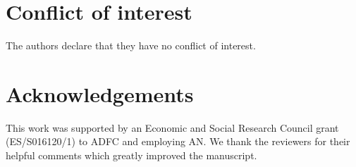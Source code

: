 \documentclass[preprint,12pt,authoryear]{elsarticle}
\begin{document}
\section*{Conflict of interest}
The authors declare that they have no conflict of interest.

\section*{Acknowledgements}
This work was supported by an Economic and Social Research Council grant (ES/S016120/1) to ADFC and employing AN. We thank the reviewers for their helpful comments which greatly improved the manuscript.

\end{document}
